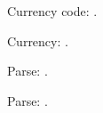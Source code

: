 \documentclass{article}
\begin{document}
Currency code: \DTLCurrencyCode.

Currency: \result.

Parse: \DTLparse{}\result.


Parse: \DTLparse{}\result.
\end{document}
